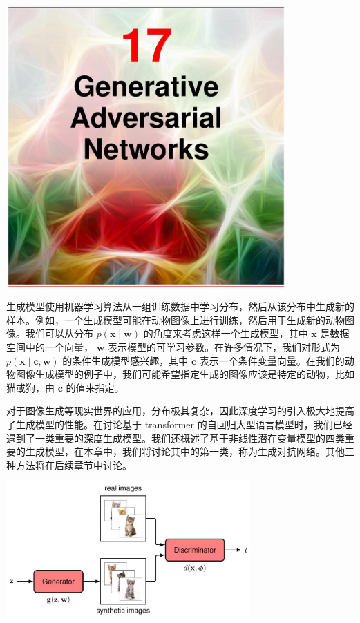 \documentclass[10pt]{report}
\begin{document}
\begin{center}
\includegraphics[max width=0.8\textwidth]{images/0194e279-9b28-703a-88f4-c3ac21e2010d_552_474_351_1074_1085_0.jpg}
\end{center}
\hspace*{3em} 

生成模型使用机器学习算法从一组训练数据中学习分布，然后从该分布中生成新的样本。例如，一个生成模型可能在动物图像上进行训练，然后用于生成新的动物图像。我们可以从分布 \(p\left( {\mathbf{x} \mid  \mathbf{w}}\right)\) 的角度来考虑这样一个生成模型，其中 \(\mathbf{x}\) 是数据空间中的一个向量， \(\mathbf{w}\) 表示模型的可学习参数。在许多情况下，我们对形式为 \(p\left( {\mathbf{x} \mid  \mathbf{c},\mathbf{w}}\right)\) 的条件生成模型感兴趣，其中 \(\mathbf{c}\) 表示一个条件变量向量。在我们的动物图像生成模型的例子中，我们可能希望指定生成的图像应该是特定的动物，比如猫或狗，由 \(\mathbf{c}\) 的值来指定。

对于图像生成等现实世界的应用，分布极其复杂，因此深度学习的引入极大地提高了生成模型的性能。在讨论基于 transformer 的自回归大型语言模型时，我们已经遇到了一类重要的深度生成模型。我们还概述了基于非线性潜在变量模型的四类重要的生成模型，在本章中，我们将讨论其中的第一类，称为生成对抗网络。其他三种方法将在后续章节中讨论。

\begin{center}
\includegraphics[max width=0.7\textwidth]{images/0194e279-9b28-703a-88f4-c3ac21e2010d_553_547_353_921_513_0.jpg}
\end{center}
\hspace*{3em} 
\end{document}

